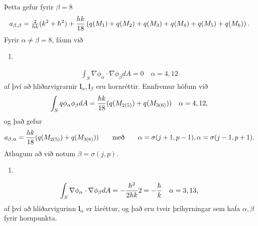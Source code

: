 \documentclass[a4paper,10pt,icelandic]{sphinxmanual}
\begin{document}
Þetta gefur fyrir \(\beta=8\)
\begin{equation*}
\begin{split}a_{\beta,\beta}=\tfrac{2}{h k}(k^2+h^2) +{h k\over 18} \left(q(M_1)+q(M_2)+q(M_3)+q(M_4)+q(M_5)+q(M_6)\right).\end{split}
\end{equation*}
Fyrir \(\alpha\neq \beta=8\), fáum við
\begin{enumerate}
\def\theenumi{\arabic{enumi}}
\def\labelenumi{\theenumi .}
\makeatletter\def\p@enumii{\p@enumi \theenumi .}\makeatother
\item {} 
\end{enumerate}
\begin{equation*}
\begin{split}\int_S \nabla \phi_\alpha\cdot \nabla \phi_\beta dA=0  \quad \alpha=4, 12\end{split}
\end{equation*}
af því að hliðarvigrarnir \(\mathbf{l}_\alpha,\mathbf{l}_\beta\) eru hornréttir. Ennfremur höfum við
\begin{equation*}
\begin{split}\int_S q \phi_\alpha \phi_\beta dA={hk\over 18}(q(M_{2(5)})+q(M_{3(6)}))  \quad \alpha=4, 12,\end{split}
\end{equation*}
og það gefur
\begin{equation*}
\begin{split}a_{\beta,\alpha}={hk\over 18}(q(M_{2(5)})+q(M_{3(6)})) \qquad \text{með}\qquad \alpha=\sigma(j+1,p-1),  \alpha=\sigma(j-1,p+1).\end{split}
\end{equation*}
Athugum að við notum \(\beta=\sigma(j,p)\).
\begin{enumerate}
\def\theenumi{\arabic{enumi}}
\def\labelenumi{\theenumi .}
\makeatletter\def\p@enumii{\p@enumi \theenumi .}\makeatother
\setcounter{enumi}{1}
\item {} 
\end{enumerate}
\begin{equation*}
\begin{split}\int_S \nabla \phi_\alpha\cdot \nabla \phi_\beta dA=-{h^2\over 2 h k} 2=-{h\over k}  \quad \alpha=3, 13,\end{split}
\end{equation*}
af því að hliðarvigurinn \(\mathbf{l}_\alpha\) er láréttur, og það eru tveir þríhyrningar sem hafa \(\alpha, \beta\) fyrir hornpunkta.
\end{document}
